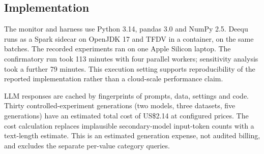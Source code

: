 \subsection{Implementation}

The monitor and harness use Python 3.14, pandas 3.0 and NumPy 2.5. Deequ runs as a Spark sidecar on OpenJDK 17 and TFDV in a container, on the same batches. The recorded experiments ran on one Apple Silicon laptop. The confirmatory run took 113 minutes with four parallel workers; sensitivity analysis took a further 79 minutes. This execution setting supports reproducibility of the reported implementation rather than a cloud-scale performance claim.

LLM responses are cached by fingerprints of prompts, data, settings and code. Thirty controlled-experiment generations (two models, three datasets, five generations) have an estimated total cost of US\$2.14 at configured prices. The cost calculation replaces implausible secondary-model input-token counts with a text-length estimate. This is an estimated generation expense, not audited billing, and excludes the separate per-value category queries.
